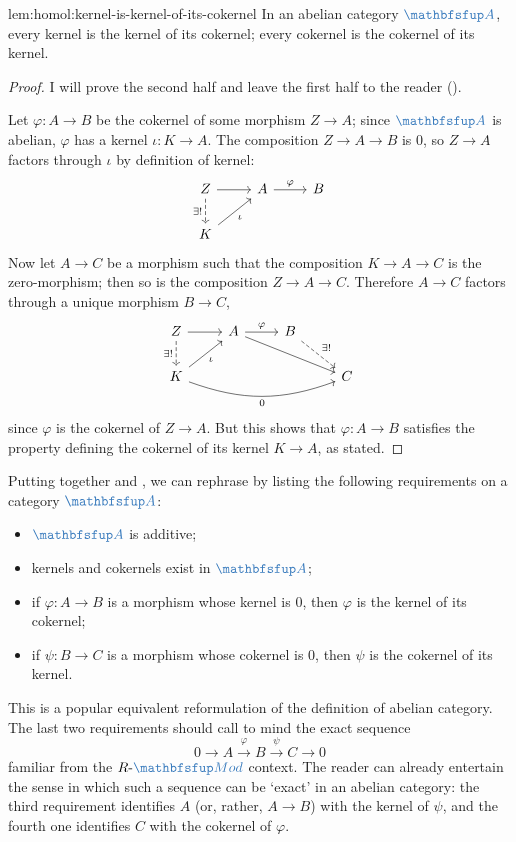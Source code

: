 \begin{lem}{}{lem:homol:kernel-is-kernel-of-its-cokernel}
  In an abelian category $\categ{A}$, every kernel is the kernel of
  its cokernel; every cokernel is the cokernel of its kernel.
\end{lem}

\begin{proof}
  I will prove the second half and leave the first half to the reader
  ().

  Let $\varphi : A \to B$ be the cokernel of some morphism $Z \to A$;
  since $\categ{A}$ is abelian, $\varphi$ has a kernel
  $\iota : K \to A$. The composition $Z \to A \to B$ is $0$, so
  $Z \to A$ factors through $\iota$ by definition of kernel:
  \[\begin{tikzcd}
      Z \arrow[r] \arrow[d, dashed, "\exists!"'] &
      A \arrow[r, "\varphi"] & B \\
      K \arrow[ur, "\iota"']
    \end{tikzcd}\] Now let $A \to C$ be a morphism such that the
  composition $K \to A \to C$ is the zero-morphism; then so is the
  composition $Z \to A \to C$. Therefore $A \to C$ factors through a
  unique morphism $B \to C$,
  \[\begin{tikzcd}
      Z \arrow[r] \arrow[d, dashed, "\exists!"'] & A \arrow[r,
      "\varphi"] \arrow[rrd, near start] &
      B \arrow[dr, dashed, "\exists!"] & \\
      K \arrow[ur, "\iota"'] \arrow[rrr, "0"', bend right=20] & & & C
    \end{tikzcd}\] since $\varphi$ is the cokernel of $Z \to A$. But
  this shows that $\varphi : A \to B$ satisfies the property defining
  the cokernel of its kernel $K \to A$, as stated.
\end{proof}
Putting together  and , we
can rephrase  by listing the following
requirements on a category $\categ{A}$:
\begin{itemize}
\item $\categ{A}$ is additive;
\item kernels and cokernels exist in $\categ{A}$;
\item if $\varphi : A \to B$ is a morphism whose kernel is $0$, then
  $\varphi$ is the kernel of its cokernel;
\item if $\psi : B \to C$ is a morphism whose cokernel is $0$, then
  $\psi$ is the cokernel of its kernel.
\end{itemize}
This is a popular equivalent reformulation of the definition of
abelian category. The last two requirements should call to mind the
exact sequence
\[
  0 \to A \xrightarrow{\varphi} B \xrightarrow{\psi} C \to 0
\]
familiar from the $R\text{-}\categ{Mod}$ context. The reader can
already entertain the sense in which such a sequence can be `exact' in
an abelian category: the third requirement identifies $A$ (or, rather,
$A \to B$) with the kernel of $\psi$, and the fourth one identifies
$C$ with the cokernel of $\varphi$.

